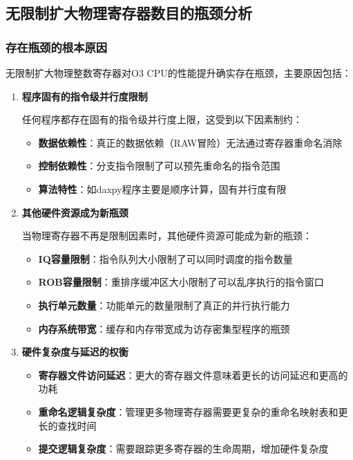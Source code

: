 \documentclass[a4paper]{article}
\begin{document}
\subsection{无限制扩大物理寄存器数目的瓶颈分析}

\subsubsection{存在瓶颈的根本原因}

无限制扩大物理整数寄存器对O3 CPU的性能提升确实存在瓶颈，主要原因包括：

\begin{enumerate}
    \item \textbf{程序固有的指令级并行度限制}
    
    任何程序都存在固有的指令级并行度上限，这受到以下因素制约：
    \begin{itemize}
        \item \textbf{数据依赖性}：真正的数据依赖（RAW冒险）无法通过寄存器重命名消除
        \item \textbf{控制依赖性}：分支指令限制了可以预先重命名的指令范围
        \item \textbf{算法特性}：如daxpy程序主要是顺序计算，固有并行度有限
    \end{itemize}
    
    \item \textbf{其他硬件资源成为新瓶颈}
    
    当物理寄存器不再是限制因素时，其他硬件资源可能成为新的瓶颈：
    \begin{itemize}
        \item \textbf{IQ容量限制}：指令队列大小限制了可以同时调度的指令数量
        \item \textbf{ROB容量限制}：重排序缓冲区大小限制了可以乱序执行的指令窗口
        \item \textbf{执行单元数量}：功能单元的数量限制了真正的并行执行能力
        \item \textbf{内存系统带宽}：缓存和内存带宽成为访存密集型程序的瓶颈
    \end{itemize}
    
    \item \textbf{硬件复杂度与延迟的权衡}
    
    \begin{itemize}
        \item \textbf{寄存器文件访问延迟}：更大的寄存器文件意味着更长的访问延迟和更高的功耗
        \item \textbf{重命名逻辑复杂度}：管理更多物理寄存器需要更复杂的重命名映射表和更长的查找时间
        \item \textbf{提交逻辑复杂度}：需要跟踪更多寄存器的生命周期，增加硬件复杂度
    \end{itemize}
\end{enumerate}
\end{document}
